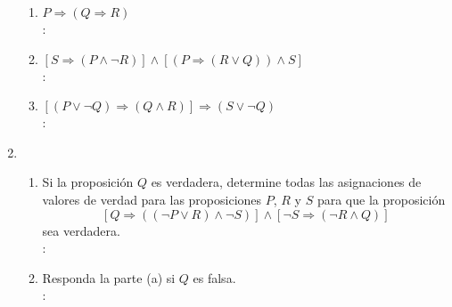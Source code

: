 \begin{enumerate}[label=0.1.\arabic*]
\begin{enumerate}[label=(\arabic*)]
		\item $ P \Longrightarrow ( Q \Longrightarrow R ) $ \\
		\solucion: \\
		
		\item $ [S \Longrightarrow (P \wedge \neg R)] \wedge [( P \Longrightarrow (R \vee Q) ) \wedge S] $ \\
		\solucion: \\
		
		\item $ [(P \vee \neg Q) \Longrightarrow (Q \wedge R)] \Longrightarrow (S \vee \neg Q) $ \\
		\solucion: \\
		
	\end{enumerate}

	\item
	\begin{enumerate}[label=(\alph*)]
		\item Si la proposición $ Q $ es verdadera, determine todas las asignaciones de valores de verdad para las proposiciones $ P $, $ R $ y $ S $ para que la proposición
		\[ [Q \Longrightarrow ((\neg P \vee R) \wedge \neg S)] \wedge [\neg S \Longrightarrow (\neg R \wedge Q)] \]
		sea verdadera. \\
		\solucion: \\
		
		\item Responda la parte (a) si $ Q $ es falsa. \\
		\solucion: \\
		
	\end{enumerate}

	
\end{enumerate}


